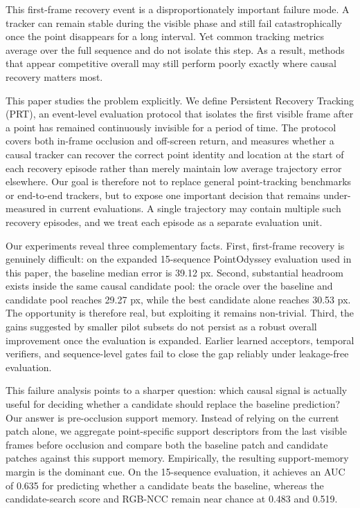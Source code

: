 \documentclass[10pt,journal,compsoc]{IEEEtran}
\newcommand{\task}{Persistent Recovery Tracking}
\begin{document}
This first-frame recovery event is a disproportionately important failure mode. A tracker can remain stable during the visible phase and still fail catastrophically once the point disappears for a long interval. Yet common tracking metrics average over the full sequence and do not isolate this step. As a result, methods that appear competitive overall may still perform poorly exactly where causal recovery matters most.

This paper studies the problem explicitly. We define \task{} (PRT), an event-level evaluation protocol that isolates the first visible frame after a point has remained continuously invisible for a period of time. The protocol covers both in-frame occlusion and off-screen return, and measures whether a causal tracker can recover the correct point identity and location at the start of each recovery episode rather than merely maintain low average trajectory error elsewhere. Our goal is therefore not to replace general point-tracking benchmarks or end-to-end trackers, but to expose one important decision that remains under-measured in current evaluations. A single trajectory may contain multiple such recovery episodes, and we treat each episode as a separate evaluation unit.

Our experiments reveal three complementary facts. First, first-frame recovery is genuinely difficult: on the expanded 15-sequence PointOdyssey evaluation used in this paper, the baseline median error is 39.12 px. Second, substantial headroom exists inside the same causal candidate pool: the oracle over the baseline and candidate pool reaches 29.27 px, while the best candidate alone reaches 30.53 px. The opportunity is therefore real, but exploiting it remains non-trivial. Third, the gains suggested by smaller pilot subsets do not persist as a robust overall improvement once the evaluation is expanded. Earlier learned acceptors, temporal verifiers, and sequence-level gates fail to close the gap reliably under leakage-free evaluation.

This failure analysis points to a sharper question: which causal signal is actually useful for deciding whether a candidate should replace the baseline prediction? Our answer is pre-occlusion support memory. Instead of relying on the current patch alone, we aggregate point-specific support descriptors from the last visible frames before occlusion and compare both the baseline patch and candidate patches against this support memory. Empirically, the resulting support-memory margin is the dominant cue. On the 15-sequence evaluation, it achieves an AUC of 0.635 for predicting whether a candidate beats the baseline, whereas the candidate-search score and RGB-NCC remain near chance at 0.483 and 0.519.
\end{document}
